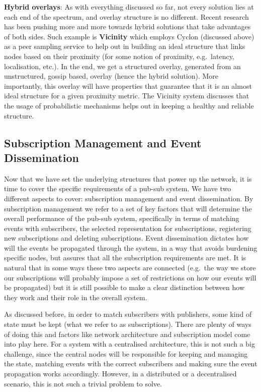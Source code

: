 \textbf{Hybrid overlays}: As with everything discussed so far, not every
solution lies at each end of the spectrum, and overlay structure is no
different. Recent research has been pushing more and more towards hybrid
solutions that take advantages of both sides. Such example is
\textbf{Vicinity} \cite{Voulgaris2013} which employs Cyclon
(discussed above) as a peer sampling service to help out in building an
ideal structure that links nodes based on their proximity (for some
notion of proximity, e.g.~latency, localisation, etc.). In the end, we
get a structured overlay, generated from an unstructured, gossip based,
overlay (hence the hybrid solution). More importantly, this overlay will
have properties that guarantee that it is an almost ideal structure for
a given proximity metric. The Vicinity system discusses that the usage
of probabilistic mechanisms helps out in keeping a healthy and reliable
structure.

\subsection{Subscription Management and Event
Dissemination}\label{subscription-management-and-event-dissemination}

Now that we have set the underlying structures that power up the
network, it is time to cover the specific requirements of a pub-sub
system. We have two different aspects to cover: subscription management
and event dissemination. By subscription management we refer to a set of
key factors that will determine the overall performance of the pub-sub
system, specifically in terms of matching events with subscribers, the
selected representation for subscriptions, registering new subscriptions
and deleting subscriptions. Event dissemination dictates how will the
events be propagated through the system, in a way that avoids burdening
specific nodes, but assures that all the subscription requirements are
met. It is natural that in some ways these two aspects are connected
(e.g.~the way we store our subscriptions will probably impose a set of
restrictions on how our events will be propagated) but it is still
possible to make a clear distinction between how they work and their
role in the overall system.

As discussed before, in order to match subscribers with publishers, some
kind of state must be kept (what we refer to as subscriptions). There are
plenty of ways of doing this and factors like network architecture and
subscription model come into play here. For a system with a centralised
architecture, this is not such a big challenge, since the central nodes
will be responsible for keeping and managing the state, matching events
with the correct subscribers and making sure the event propagation works
accordingly. However, in a distributed or a decentralised scenario, this
is not such a trivial problem to solve.

